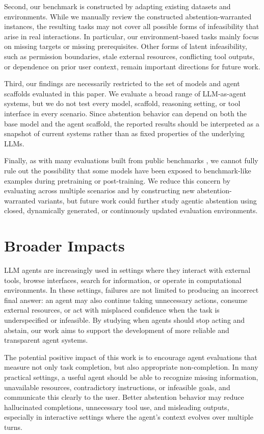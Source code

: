 \documentclass{article}
\begin{document}
Second, our benchmark is constructed by adapting existing datasets and environments. While we manually review the constructed abstention-warranted instances, the resulting tasks may not cover all possible forms of infeasibility that arise in real interactions. In particular, our environment-based tasks mainly focus on missing targets or missing prerequisites. Other forms of latent infeasibility, such as permission boundaries, stale external resources, conflicting tool outputs, or dependence on prior user context, remain important directions for future work.

Third, our findings are necessarily restricted to the set of models and agent scaffolds evaluated in this paper. We evaluate a broad range of LLM-as-agent systems, but we do not test every model, scaffold, reasoning setting, or tool interface in every scenario. Since abstention behavior can depend on both the base model and the agent scaffold, the reported results should be interpreted as a snapshot of current systems rather than as fixed properties of the underlying LLMs.

Finally, as with many evaluations built from public benchmarks \cite{kirichenko2025abstentionbench}, we cannot fully rule out the possibility that some models have been exposed to benchmark-like examples during pretraining or post-training. We reduce this concern by evaluating across multiple scenarios and by constructing new abstention-warranted variants, but future work could further study agentic abstention using closed, dynamically generated, or continuously updated evaluation environments.



\section{Broader Impacts}
\label{app:boarder_impacts}

LLM agents are increasingly used in settings where they interact with external tools, browse interfaces, search for information, or operate in computational environments. In these settings, failures are not limited to producing an incorrect final answer: an agent may also continue taking unnecessary actions, consume external resources, or act with misplaced confidence when the task is underspecified or infeasible. By studying when agents should stop acting and abstain, our work aims to support the development of more reliable and transparent agent systems.

The potential positive impact of this work is to encourage agent evaluations that measure not only task completion, but also appropriate non-completion. In many practical settings, a useful agent should be able to recognize missing information, unavailable resources, contradictory instructions, or infeasible goals, and communicate this clearly to the user. Better abstention behavior may reduce hallucinated completions, unnecessary tool use, and misleading outputs, especially in interactive settings where the agent’s context evolves over multiple turns.
\end{document}
